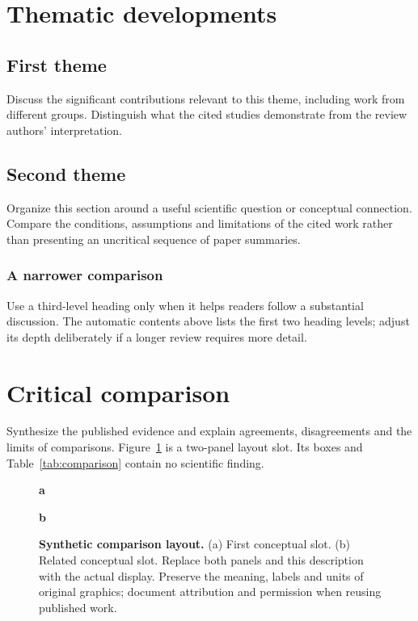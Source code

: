 \documentclass[letterpaper,11pt]{article}
\begin{document}
\section{Thematic developments}\label{sec:themes}
\subsection{First theme}\label{sec:first-theme}
Discuss the significant contributions relevant to this theme, including work
from different groups. Distinguish what the cited studies demonstrate from
the review authors' interpretation.

\subsection{Second theme}\label{sec:second-theme}
Organize this section around a useful scientific question or conceptual
connection. Compare the conditions, assumptions and limitations of the cited
work rather than presenting an uncritical sequence of paper summaries.

\subsubsection{A narrower comparison}\label{sec:narrower-comparison}
Use a third-level heading only when it helps readers follow a substantial
discussion. The automatic contents above lists the first two heading levels;
adjust its depth deliberately if a longer review requires more detail.

\section{Critical comparison}\label{sec:comparison}
Synthesize the published evidence and explain agreements, disagreements and
the limits of comparisons. Figure~\ref{fig:comparison} is a two-panel layout
slot. Its boxes and Table~\ref{tab:comparison} contain no scientific finding.

\begin{figure}[htbp]
\centering
\begin{minipage}[t]{0.47\linewidth}
\centering\textbf{a}\par\smallskip
{}
\end{minipage}\hfill
\begin{minipage}[t]{0.47\linewidth}
\centering\textbf{b}\par\smallskip
{}
\end{minipage}
\caption{\textbf{Synthetic comparison layout.} (a) First conceptual slot.
(b) Related conceptual slot. Replace both panels and this description with
the actual display. Preserve the meaning, labels and units of original
graphics; document attribution and permission when reusing published work.}
\label{fig:comparison}
\end{figure}
\end{document}
